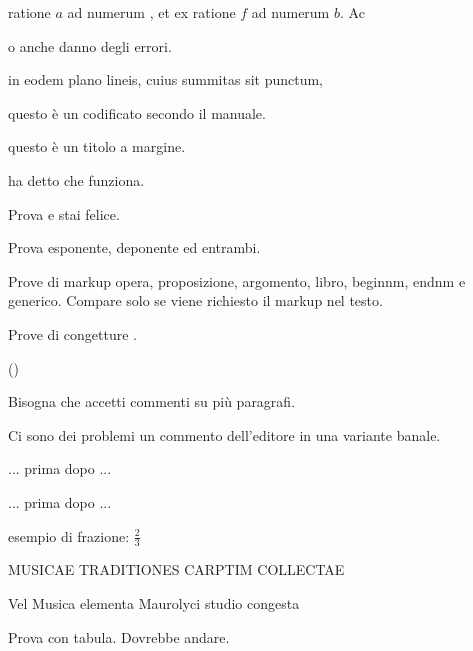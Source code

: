 \documentclass[12pt]{book}
\begin{document}
 ratione  
$a$ ad numerum , et ex ratione  $f$ ad numerum $b$. \Unit Ac 
\par
{}
o anche
danno degli errori.
\par
in eodem plano  lineis, cuius summitas sit punctum,
\par
questo \`e un  codificato secondo il manuale.
\par
\begin{titmarg}
questo \`e un titolo a margine.
\end{titmarg}
\par
{} ha detto che funziona.
\par
Prova  e stai felice.
\par
Prova esponente, deponente
ed entrambi.
\par
Prove di markup opera,
proposizione, 
argomento,
libro,
beginnm\BeginNM{},
endnm\EndNM{}
e generico.
Compare solo se viene richiesto il markup nel testo.
\par
Prove di congetture .
\par
()
\par
Bisogna che accetti commenti
su pi{\`u} paragrafi.
\begin{Enunciatio}
Ci sono dei problemi  un commento dell'editore
in una variante banale.
\end{Enunciatio}
\par
... prima  dopo ...
\par
... prima  dopo ...
\par
esempio di frazione: $\frac{2}{3}$
\par
\begin{Enunciatio}
MUSICAE TRADITIONES CARPTIM COLLECTAE
\par
Vel Musica elementa Maurolyci studio congesta
\end{Enunciatio}
\par Prova con tabula. Dovrebbe andare.
\end{document}
